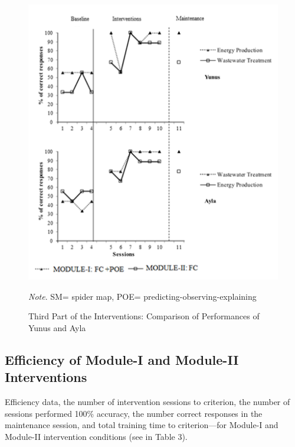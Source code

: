 \documentclass[11.5pt]{sig-alternate} %
\begin{document}
\begin{large}
\begin{figure}[ht]
    \includegraphics[width=1\linewidth]{images/fig4.png}
    \caption{Third Part of the Interventions: Comparison of Performances of Yunus and Ayla} \vspace{1em}
    \textit{Note}. SM= spider map, POE= predicting-observing-explaining
\end{figure}

\subsection*{Efficiency of Module-I and Module-II Interventions}
Efficiency data, the number of intervention sessions to criterion, the number of sessions performed 100\% accuracy, the number correct responses in the maintenance session, and total training time to criterion—for Module-I and Module-II intervention conditions (see in Table 3). 


\end{large}
\end{document}
